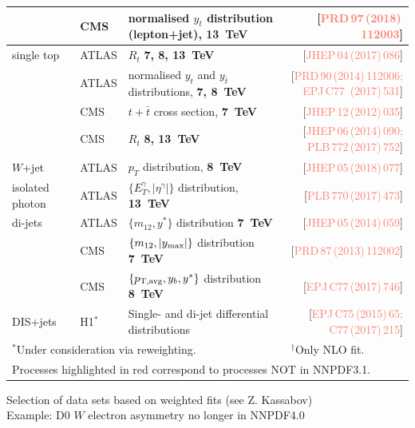 \documentclass{beamer}
\begin{document}
\begin{frame}
\begin{tabularx}{\textwidth}{llXr}
            & CMS         & normalised $y_t$ distribution (lepton+jet), {\bf 13~TeV}         & [{\textcolor{salmon}{PRD\,97\,(2018)\,112003}}]\\ 
 \midrule
 \alert{single top} 
            & ATLAS       & $R_t$ {\bf 7, 8, 13~TeV}                                         & [{\textcolor{salmon}{JHEP\,04\,(2017)\,086}}]\\
            & ATLAS       & normalised $y_t$ and $y_{\bar{t}}$ distributions, {\bf 7, 8~TeV} & [{\textcolor{salmon}{PRD\,90\,(2014)\,112006; EPJ\,C77\, (2017)\,531}}]\\
            & CMS         & $t+\bar{t}$ cross section, {\bf 7~TeV}                           & [{\textcolor{salmon}{JHEP\,12\,(2012)\,035}}]\\
            & CMS         & $R_t$ {\bf 8, 13~TeV}                                            & [{\textcolor{salmon}{JHEP\,06\,(2014)\,090; PLB\,772\,(2017)\,752}}]\\
 \alert{$W$+jet}    
            & ATLAS       & $p_T$ distribution, {\bf 8~TeV}                                  & [{\textcolor{salmon}{JHEP\,05\,(2018)\,077}}]\\        
 \alert{isolated photon} 
            & ATLAS       & $\{E_T^\gamma,|\eta^\gamma|\}$ distribution, {\bf 13~TeV}        & [{\textcolor{salmon}{PLB\,770\,(2017)\,473}}]\\     
 \alert{di-jets}    
            & ATLAS       & $\{m_{12},y^*\}$ distribution {\bf 7~TeV}                        & [{\textcolor{salmon}{JHEP\,05\,(2014)\,059}}]\\
            & CMS         & $\{m_{12},|y_{\rm max}|\}$ distribution {\bf 7~TeV}              & [{\textcolor{salmon}{PRD\,87\,(2013)\,112002}}]\\
            & CMS         & $\{p_{\rm T,avg},y_b,y^*\}$ distribution {\bf 8~TeV}             & [{\textcolor{salmon}{EPJ\,C77\,(2017)\,746}}]\\           
 \alert{DIS+jets}   
            & H1$^*$      & Single- and di-jet differential distributions                         & [{\textcolor{salmon}{EPJ\,C75\,(2015)\,65; C77\,(2017)\,215}}]\\
 \bottomrule 
 \multicolumn{3}{l}{$^*$Under consideration via reweighting.} &
 \multicolumn{1}{l}{$^\dag$Only NLO fit.}\\
 \multicolumn{4}{l}{Processes highlighted in \alert{red} correspond to processes NOT in NNPDF3.1.}\\
 \end{tabularx}
 \vspace{-0.2cm}
 \scriptsize
 \begin{block}{}
  \centering
  Selection of data sets based on weighted fits (see Z. Kassabov)\\
  {\scriptsize Example: D0 $W$ electron asymmetry no longer in NNPDF4.0}\\
 \end{block}
\end{frame}
\end{document}
